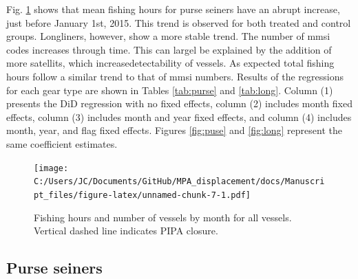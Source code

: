 \documentclass[]{article}
\begin{document}
Fig. \ref{fig:all_vessels} shows that mean fishing hours for purse
seiners have an abrupt increase, just before January 1st, 2015. This
trend is observed for both treated and control groups. Longliners,
however, show a more stable trend. The number of mmsi codes increases
through time. This can largel be explained by the addition of more
satellits, which increasedetectability of vessels. As expected total
fishing hours follow a similar trend to that of mmsi numbers. Results of
the regressions for each gear type are shown in Tables \ref{tab:purse}
and \ref{tab:long}. Column (1) presents the DiD regression with no fixed
effects, column (2) includes month fixed effects, column (3) includes
month and year fixed effects, and column (4) includes month, year, and
flag fixed effects. Figures \ref{fig:puse} and \ref{fig:long} represent
the same coefficient estimates.

\begin{figure}
\centering
\texttt{[image: C:/Users/JC/Documents/GitHub/MPA\_displacement/docs/Manuscript\_files/figure-latex/unnamed-chunk-7-1.pdf]}
\caption{\label{fig:unnamed-chunk-7}\label{fig:all_vessels}Fishing hours and
number of vessels by month for all vessels. Vertical dashed line
indicates PIPA closure.}
\end{figure}

\clearpage

\subsection{Purse seiners}\label{purse-seiners}
\end{document}
